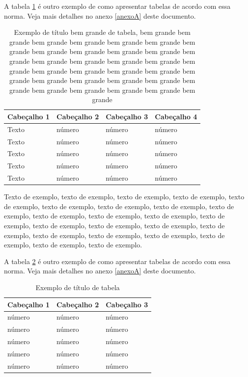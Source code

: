 \documentclass[
	12pt,				%
	oneside,			%
	a4paper,			%
	english,			%
	brazil				%
	]{abntex2ppgsi}
\begin{document}
A tabela \ref{tab:ExemploDeTabela4} é outro exemplo de como apresentar tabelas de acordo com essa norma. Veja mais detalhes no anexo \ref{anexoA} deste documento.

\begin{table}[htbp]
	\centering
	\caption{Exemplo de título bem grande de tabela, bem grande bem grande bem grande bem grande bem grande bem grande bem grande bem grande bem grande bem grande bem grande bem grande bem grande bem grande bem grande bem grande bem grande bem grande bem grande bem grande bem grande bem grande bem grande bem grande bem grande bem grande bem grande bem grande bem grande bem grande bem grande bem grande}
		\begin{tabular}{p{1.4in} p{1.4in} p{1.4in} p{1.4in} } \hline
		
		Cabeçalho 1	& Cabeçalho 2	& Cabeçalho 3	& Cabeçalho 4 \\ \hline
		Texto	& número & número	& número \\ 
		Texto	& número & número	& número \\ 
		Texto	& número & número	& número \\ 
		Texto	& número & número	& número \\ 
		Texto	& número & número	& número \\ \hline
			
		\end{tabular}
	\label{tab:ExemploDeTabela4}
\end{table}

Texto de exemplo, texto de exemplo, texto de exemplo, texto de exemplo, texto de exemplo, texto de exemplo, texto de exemplo, texto de exemplo, texto de exemplo, texto de exemplo, texto de exemplo, texto de exemplo, texto de exemplo, texto de exemplo, texto de exemplo, texto de exemplo, texto de exemplo, texto de exemplo, texto de exemplo, texto de exemplo, texto de exemplo, texto de exemplo, texto de exemplo.

A tabela \ref{tab:ExemploDeTabela5} é outro exemplo de como apresentar tabelas de acordo com essa norma. Veja mais detalhes no anexo \ref{anexoA} deste documento.

\begin{table}[htbp]
	\centering
	\caption{Exemplo de título de tabela}
		\begin{tabular}{p{1.0in} p{1.0in} p{1.0in} } \hline
		
		Cabeçalho 1	& Cabeçalho 2	& Cabeçalho 3	 \\ \hline
		número & número	& número \\ 
		número & número	& número \\ 
		número & número	& número \\ 
		número & número	& número \\ 
		número & número	& número \\ \hline
			
		\end{tabular}
	\label{tab:ExemploDeTabela5}
\end{table}
\end{document}

